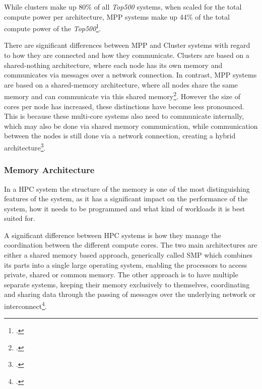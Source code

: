 While clusters make up 80\% of all \textit{Top500} systems, when scaled for the total compute power per architecture,
\ac{MPP} systems make up 44\% of the total compute power of the \textit{Top500}\footcite{top500ListStatisticsArchitecture}.

There are significant differences between \ac{MPP} and Cluster systems with regard to how they are connected and how they communicate.
Clusters are based on a shared-nothing architecture, where each node has its own memory and communicates via
messages over a network connection.
In contrast, \ac{MPP} systems are based on a shared-memory architecture,
where all nodes share the same memory and can communicate via this shared memory\footcite{dongarraHIGHPERFORMANCECOMPUTINGCLUSTERS2005a}.
However the size of cores per node has increased, these distinctions have become less pronounced.
This is because these multi-core systems also need to communicate internally, which may also be done via shared memory communication,
while communication between the nodes is still done via a network connection, creating a hybrid architecture\footcite{liNUMAawareSharedmemoryCollective}.

\subsubsection{Memory Architecture}

In a \ac{HPC} system the structure of the memory is one of the most distinguishing features of
the system, as it has a significant impact on the performance of the system, how it needs to
be programmed and what kind of workloads it is best suited for.

A significant difference between \ac{HPC} systems is how they manage the coordination between
the different compute cores. The two main architectures are either a shared memory based approach, generically
called \ac{SMP} which combines its parts into a single large operating system, enabling the processors
to access private, shared or common memory. The other approach is to have multiple separate systems,
keeping their memory exclusively to themselves, coordinating and sharing data through the passing of
messages over the underlying network or interconnect\footcite{archeruknationalsupercomputingserviceLectureHPCArchitectures2016}.


